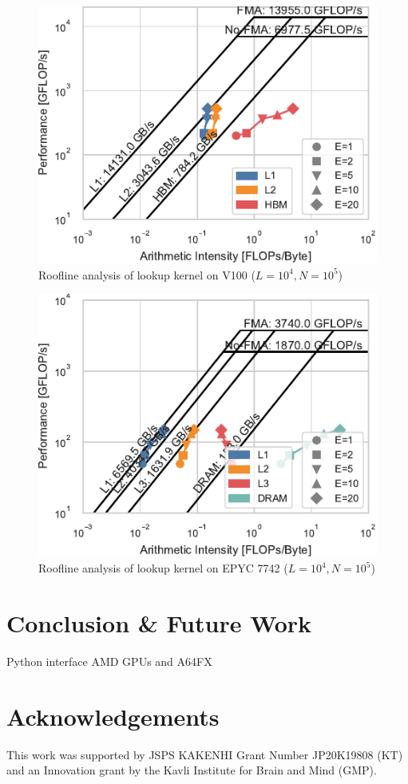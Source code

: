 \documentclass[conference]{IEEEtran}
\begin{document}
\begin{figure}
    \centering
    \includegraphics{figs/roofline_lookup_wo_rho_v100}
    \caption{Roofline analysis of lookup kernel on V100 ($L=10^4, N=10^5$)}%
    \label{fig:roofline-lookup-v100}
\end{figure}

\begin{figure}
    \centering
    \includegraphics{figs/roofline_lookup_wo_rho_epyc}
    \caption{Roofline analysis of lookup kernel on EPYC 7742 ($L=10^4, N=10^5$)}%
    \label{fig:roofline-lookup-eypc}
\end{figure}

\section{Conclusion \& Future Work}\label{sec:conclusion}

Python interface
AMD GPUs and A64FX

\section*{Acknowledgements}
This work was supported by JSPS KAKENHI Grant Number JP20K19808 (KT) and an
Innovation grant by the Kavli Institute for Brain and Mind (GMP).

\clearpage



\end{document}
